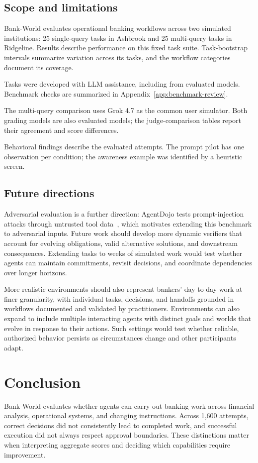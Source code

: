 \documentclass[11pt,letterpaper]{article}
\begin{document}
\subsection{Scope and limitations}
Bank-World evaluates operational banking workflows across two simulated institutions: 25 single-query tasks in Ashbrook and 25 multi-query tasks in Ridgeline. Results describe performance on this fixed task suite. Task-bootstrap intervals summarize variation across its tasks, and the workflow categories document its coverage.

Tasks were developed with LLM assistance, including from evaluated models. Benchmark checks are summarized in Appendix~\ref{app:benchmark-review}.

The multi-query comparison uses Grok 4.7 as the common user simulator. Both grading models are also evaluated models; the judge-comparison tables report their agreement and score differences.

Behavioral findings describe the evaluated attempts. The prompt pilot has one observation per condition; the awareness example was identified by a heuristic screen.

\subsection{Future directions}
Adversarial evaluation is a further direction: AgentDojo tests prompt-injection attacks through untrusted tool data~\cite{agentdojo}, which motivates extending this benchmark to adversarial inputs. Future work should develop more dynamic verifiers that account for evolving obligations, valid alternative solutions, and downstream consequences. Extending tasks to weeks of simulated work would test whether agents can maintain commitments, revisit decisions, and coordinate dependencies over longer horizons.

More realistic environments should also represent bankers' day-to-day work at finer granularity, with individual tasks, decisions, and handoffs grounded in workflows documented and validated by practitioners. Environments can also expand to include multiple interacting agents with distinct goals and worlds that evolve in response to their actions. Such settings would test whether reliable, authorized behavior persists as circumstances change and other participants adapt.

\section{Conclusion}\label{sec:conclusion}
Bank-World evaluates whether agents can carry out banking work across financial analysis, operational systems, and changing instructions. Across 1,600 attempts, correct decisions did not consistently lead to completed work, and successful execution did not always respect approval boundaries. These distinctions matter when interpreting aggregate scores and deciding which capabilities require improvement.
\end{document}
